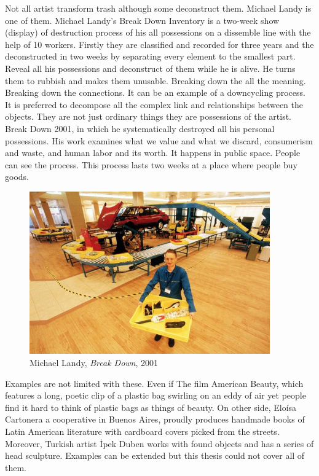 Not all artist transform trash although some deconstruct them. Michael Landy is one of them. Michael Landy’s Break Down Inventory is a two-week show (display) of destruction process of his all possessions on a dissemble line with the help of 10 workers. Firstly they are classified and recorded for three years and the deconstructed in two weeks by separating every element to the smallest part. Reveal all his possessions and deconstruct of them while he is alive. He turns them to rubbish and makes them unusable. Breaking down the all the meaning. Breaking down the connections. It can be an example of a downcycling process. It is preferred to decompose all the complex link and relationships between the objects. They are not just ordinary things they are possessions of the artist. Break Down 2001, in which he systematically destroyed all his personal possessions. His work examines what we value and what we discard, consumerism and waste, and human labor and its worth. It happens in public space. People can see the process. This process lasts two weeks at a place where people buy goods.

\begin{figure}[h!]
  \centering
  \includegraphics[height=7cm]{graphics/MichaelLandy_BreakDown.jpg}
  \caption{Michael Landy, \textit{Break Down}, 2001}
  \label{fig:MichaelLandy_BreakDown}
\end{figure}

Examples are not limited with these. Even if  The film American Beauty, which features a long, poetic clip of a plastic bag swirling on an eddy of air yet people find it hard to think of plastic bags as things of beauty. On other side, Eloísa Cartonera a cooperative in Buenos Aires, proudly produces handmade books of Latin American literature with cardboard covers picked from the streets. Moreover, Turkish artist İpek Duben works with found objects and has a series of head sculpture. Examples can be extended but this thesis could not cover all of them.



